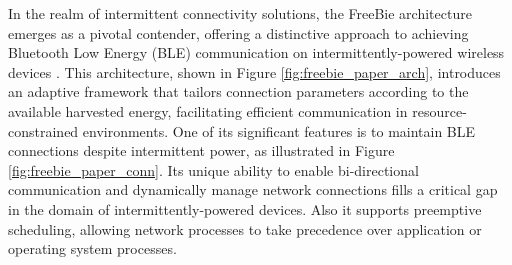 In the realm of intermittent connectivity solutions, the FreeBie architecture emerges as a pivotal contender, offering a distinctive approach to achieving Bluetooth Low Energy (BLE) communication on intermittently-powered wireless devices \cite{de2022Intermittently}. This architecture, shown in Figure \ref{fig:freebie_paper_arch}, introduces an adaptive framework that tailors connection parameters according to the available harvested energy, facilitating efficient communication in resource-constrained environments. One of its significant features is to maintain BLE connections despite intermittent power, as illustrated in Figure \ref{fig:freebie_paper_conn}. Its unique ability to enable bi-directional communication and dynamically manage network connections fills a critical gap in the domain of intermittently-powered devices. Also it supports preemptive scheduling, allowing network processes to take precedence over application or operating system processes.
\vspace{1\baselineskip}

